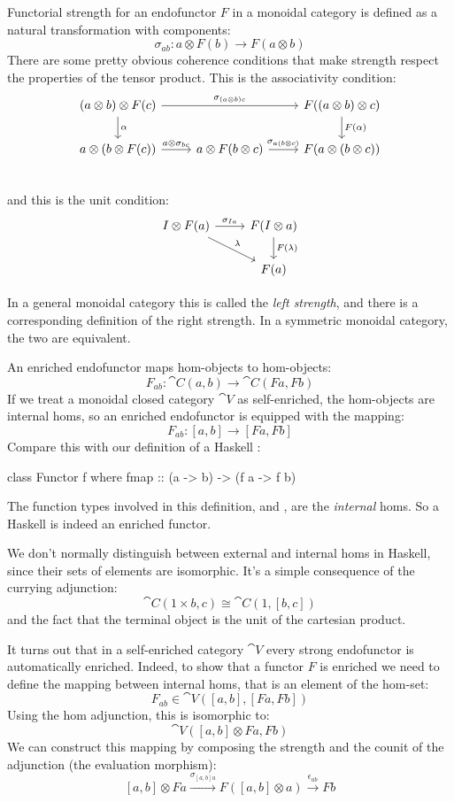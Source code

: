 \documentclass[DaoFP]{subfiles}
\begin{document}
Functorial strength for an endofunctor $F$ in a monoidal category is defined as a natural transformation with components:
\[ \sigma_{a b} \colon a \otimes F(b) \to F (a \otimes b) \]
There are some pretty obvious coherence conditions that make strength respect the properties of the tensor product. This is the associativity condition:
\[
 \begin{tikzcd}
 (a \otimes b) \otimes F (c) 
 \arrow[rr, "\sigma_{(a \otimes b) c}"]
 \arrow[d, "\alpha"]
 && F((a \otimes b) \otimes c)
 \arrow[d, "F(\alpha)"]
 \\
 a \otimes (b \otimes F(c))
 \arrow[r, "a \otimes \sigma_{b c}"]
 & a \otimes F(b \otimes c)
 \arrow[r, "\sigma_{a (b \otimes c)}"]
 & F(a \otimes (b \otimes c))
 \\
 \end{tikzcd}
\]
and this is the unit condition:
\[
 \begin{tikzcd}
 I \otimes F(a)
 \arrow[r, "\sigma_{I a}"]
 \arrow[rd, "\lambda"]
 & F(I \otimes a)
 \arrow[d, "F (\lambda)"]
 \\
 & F(a)
 \end{tikzcd}
\]

In a general monoidal category this is called the \emph{left strength}, and there is a corresponding definition of the right strength. In a symmetric monoidal category, the two are equivalent.

An enriched endofunctor maps hom-objects to hom-objects:
\[ F_{a b} \colon \cat C (a, b) \to \cat C (F a, F b) \]
If we treat a monoidal closed category $\cat V$ as self-enriched, the hom-objects are internal homs, so an enriched endofunctor is equipped with the mapping:
\[ F_{a b} \colon [a, b] \to [F a, F b] \]
Compare this with our definition of a Haskell :
\begin{haskell}
class Functor f where
  fmap :: (a -> b) -> (f a -> f b)
\end{haskell}
The function types involved in this definition,  and , are the \emph{internal} homs. So a Haskell  is indeed an enriched functor. 

We don't normally distinguish between external and internal homs in Haskell, since their sets of elements are isomorphic. It's a simple consequence of the currying adjunction:
\[ \cat C(1 \times b, c) \cong \cat C(1, [b, c]) \]
and the fact that the terminal object is the unit of the cartesian product.

It turns out that in a self-enriched category $\cat V$ every strong endofunctor is automatically enriched. Indeed, to show that a functor $F$ is enriched we need to define the mapping between internal homs, that is an element of the hom-set:
\[ F_{a b} \in \cat V([a, b], [F a, F b]) \]
Using the hom adjunction, this is isomorphic to:
\[ \cat V([a, b] \otimes F a, F b) \]
We can construct this mapping by composing the strength and the counit of the adjunction (the evaluation morphism):
\[ [a, b] \otimes F a \xrightarrow{\sigma_{[a, b] a}} F ([a, b] \otimes a) \xrightarrow{\epsilon_{a b}} F b \]
\end{document}
